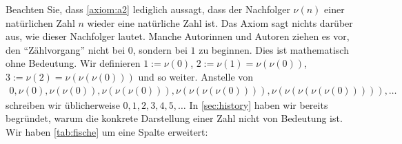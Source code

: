 \bemerkungen{-}{}
{Beachten Sie, dass \cref{axiom:a2} lediglich aussagt, dass der Nachfolger $\nu(n)$ einer natürlichen Zahl $n$ wieder eine natürliche Zahl ist. Das Axiom sagt nichts darüber aus, wie dieser Nachfolger lautet.}
{Manche Autorinnen und Autoren ziehen es vor, den \enquote{Zählvorgang} nicht bei $0$, sondern bei $1$ zu beginnen. Dies ist mathematisch ohne Bedeutung. \cite{AmannEscher1}}
{Wir definieren $1:=\nu(0)$, $2:=\nu(1)=\nu(\nu(0))$, $3:=\nu(2)=\nu(\nu(\nu(0)))$ und so weiter. Anstelle von
\begin{align*}
    0, \nu(0), \nu(\nu(0)), \nu(\nu(\nu(0))), \nu(\nu(\nu(\nu(0)))), \nu(\nu(\nu(\nu(\nu(0))))), \ldots
\end{align*}
schreiben wir üblicherweise $0, 1, 2, 3, 4, 5, \ldots$
}
In \cref{sec:history} haben wir bereits begründet, warum die konkrete Darstellung einer Zahl nicht von Bedeutung ist. Wir haben \cref{tab:fische} um eine Spalte erweitert:
